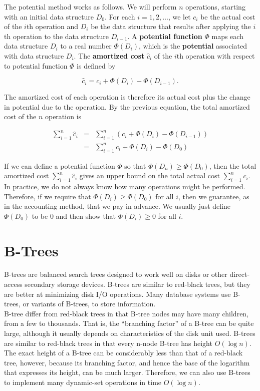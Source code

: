 \documentclass[12pt]{article}
\begin{document}
The potential method works as follows. We will perform $n$ operations, starting with an initial data structure $D_0$. For each $i = 1,2,\dots$, we let $c_i$ be the actual cost of the $i$th operation and $D_i$ be the data structure that results after applying the $i$th operation to the data structure $D_{i-1}$. A \textbf{potential function} $\Phi$ maps each data structure $D_i$ to a real number $\Phi(D_i)$, which is the \textbf{potential} associated with data structure $D_i$. The \textbf{amortized cost} $\hat{c}_i$ of the $i$th operation with respect to potential function $\Phi$ is defined by

\begin{equation*}
  \hat{c}_i = c_i + \Phi(D_i) - \Phi(D_{i-1}).
\end{equation*}

The amortized cost of each operation is therefore its actual cost plus the change in potential due to the operation. By the previous equation, the total amortized cost of the $n$ operation is

\begin{eqnarray*}
  \sum_{i=1}^n \hat{c}_i
  &=& \sum_{i=1}^n (c_i + \Phi(D_i) - \Phi(D_{i-1})) \\
  &=& \sum_{i=1}^n c_i + \Phi(D_i) - \Phi(D_0)
\end{eqnarray*}

If we can define a potential function $\Phi$ so that $\Phi(D_n) \ge \Phi(D_0)$, then the total amortized cost $\sum_{i=1}^n \hat{c}_i$ gives an upper bound on the total actual cost $\sum_{i=1}^n c_i$. In practice, we do not always know how many operations might be performed. Therefore, if we require that $\Phi(D_i) \ge \Phi(D_0)$ for all $i$, then we guarantee, as in the accounting method, that we pay in advance. We usually just define $\Phi(D_0)$ to be 0 and then show that $\Phi(D_i) \ge 0$ for all $i$.

\section{B-Trees}

B-trees are balanced search trees designed to work well on disks or other direct-access secondary storage devices. B-trees are similar to red-black trees, but they are better at minimizing disk I/O operations. Many database systems use B-trees, or variants of B-trees, to store information. \\

B-tree differ from red-black trees in that B-tree nodes may have many children, from a few to thousands. That is, the ``branching factor'' of a B-tree can be quite large, although it usually depends on characteristics of the disk unit used. B-trees are similar to red-black trees in that every n-node B-tree has height $O(\log n)$. The exact height of a B-tree can be considerably less than that of a red-black tree, however, because its branching factor, and hence the base of the logarithm that expresses its height, can be much larger. Therefore, we can also use B-trees to implement many dynamic-set operations in time $O(\log n)$.
\end{document}

